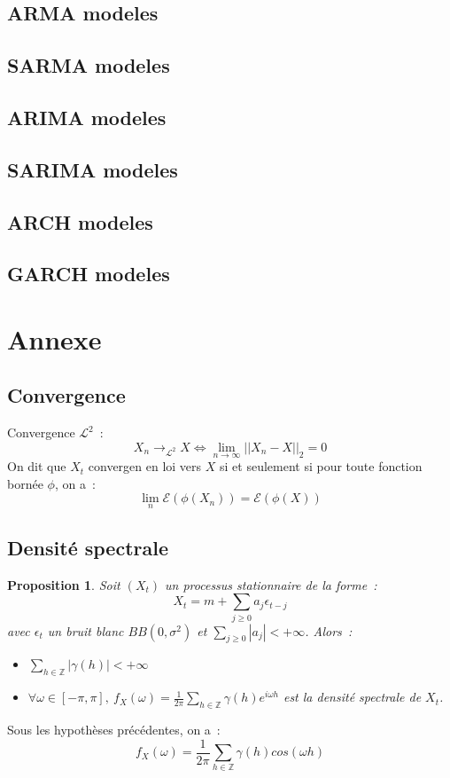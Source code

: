 \documentclass[11pt]{scrartcl} %
\newtheorem{pro}[theorem]{Proposition}
\begin{document}
\subsection{ARMA modeles}
\subsection{SARMA modeles}
\subsection{ARIMA modeles}
\subsection{SARIMA modeles}
\subsection{ARCH modeles}
\subsection{GARCH modeles}

\section{Annexe}
\subsection{Convergence}
Convergence $\mathcal{L}^2$~:
$$
X_n\rightarrow_{\mathcal{L^2}} X \Leftrightarrow  \lim_{n\rightarrow \infty}||X_n-X||_2=0
$$
On dit que $X_t$ convergen en loi vers $X$ si et seulement si pour toute fonction bornée $\phi$, on a~:~
$$
\lim_{n}\mathcal{E}(\phi(X_n))=\mathcal{E}\left(\phi(X)\right)
$$
\subsection{Densité spectrale}
\begin{pro}
Soit $(X_t)$ un processus stationnaire de la forme~:
$$
X_t = m+\sum_{j\geq 0}a_j\epsilon_{t-j}
$$
avec $\epsilon_t$ un bruit blanc $BB(0,\sigma^2)$ et $\sum_{j\geq 0}|a_j|<+\infty$. Alors~:
\begin{itemize}
\item $\sum_{h\in\mathbb{Z}}|\gamma(h)|<+\infty$\\
\item $\forall \omega\in[-\pi,\pi],~f_X(\omega)=\frac{1}{2\pi}\sum_{h\in\mathbb{Z}}\gamma(h)e^{i\omega h}$ est la densité spectrale de $X_t$.
\end{itemize}
\end{pro}
Sous les hypothèses précédentes, on a~:
$$
f_X(\omega)=\frac{1}{2\pi}\sum_{h\in\mathbb{Z}}\gamma(h)cos(\omega h)
$$
\end{document}
